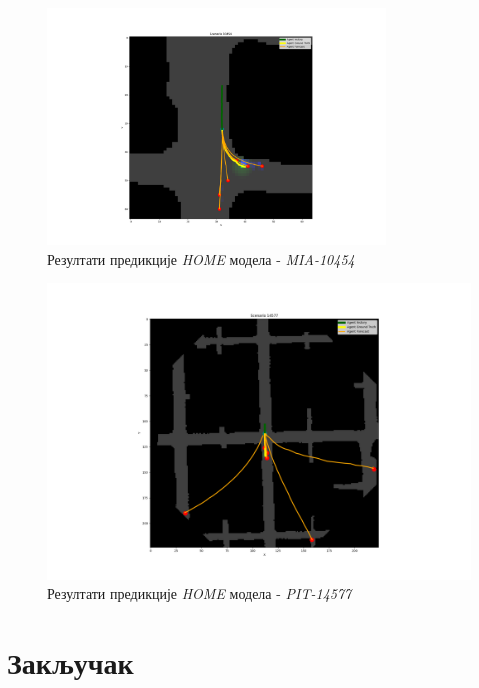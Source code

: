 \documentclass[11pt,oneside]{memoir}
\begin{document}
\begin{figure}[H]
  \centering
  \includegraphics[width=0.8\textwidth]{images/home_MIA_10454.png}
  \caption{Резултати предикције \textit{HOME} модела - \textit{MIA-10454} \label{home-MIA-10454}}
\end{figure}

\begin{figure}[H]
  \centering
  \includegraphics[width=1.0\textwidth]{images/home_PIT_14577.png}
  \caption{Резултати предикције \textit{HOME} модела - \textit{PIT-14577} \label{home-PIT-14577}}
\end{figure}

\chapter{Закључак}
\end{document}

